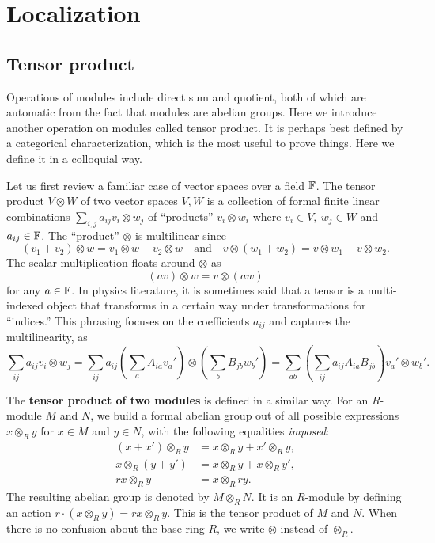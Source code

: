 \section{Localization}
\label{sec:localization}

\subsection*{Tensor product}
Operations of modules include direct sum and quotient,
both of which are automatic from the fact that modules are abelian groups.
Here we introduce another operation on modules called tensor product.
It is perhaps best defined by a categorical characterization,
which is the most useful to prove things.
Here we define it in a colloquial way.

Let us first review a familiar case of vector spaces over a field $\mathbb{F}$.
The tensor product $V \otimes W$ of two vector spaces $V,W$ is
a collection of formal finite linear combinations $\sum_{i,j} a_{ij} v_i \otimes w_j$ 
of ``products'' $v_i \otimes w_i$ where $v_i \in V,~ w_j \in W$ and $a_{ij} \in \mathbb{F}$.
The ``product'' $\otimes$ is multilinear since
\[
 (v_1 + v_2) \otimes w = v_1 \otimes w + v_2 \otimes w \quad \text{and} \quad
 v \otimes (w_1 + w_2) = v \otimes w_1 + v \otimes w_2.
\]
The scalar multiplication floats around $\otimes$ as
\[
 (a v) \otimes w = v \otimes (a w)
\]
for any $a \in \mathbb{F}$.
In physics literature, it is sometimes said that a tensor is a multi-indexed object
that transforms in a certain way under transformations for ``indices.''
This phrasing focuses on the coefficients $a_{ij}$ and captures the multilinearity, as
\[
 \sum_{ij} a_{ij} v_i \otimes w_j = \sum_{ij} a_{ij} \left( \sum_a A_{ia}v_a' \right) \otimes \left( \sum_b B_{jb} w_b' \right)
 = \sum_{ab} \left(\sum_{ij}a_{ij} A_{ia}B_{jb} \right) v_a' \otimes w_b'.
\]


The {\bf tensor product of two modules} is defined in a similar way.
For an $R$-module $M$ and $N$,
we build a formal abelian group out of all possible expressions $x \otimes_R y$ for $x \in M$ and $y \in N$,
with the following equalities {\em imposed}:
\begin{align}
 (x + x') \otimes_R y &= x \otimes_R y + x' \otimes_R y , \nonumber \\
 x \otimes_R (y + y')  &= x \otimes_R y + x \otimes_R y' ,\nonumber \\
 r x \otimes_R y &= x \otimes_R r y .\label{R-linear-tensor}
\end{align}
The resulting abelian group is denoted by $M \otimes_R N$.
It is an $R$-module by defining an action $r \cdot (x \otimes_R y) = rx \otimes_R y$.
This is the tensor product of $M$ and $N$.
When there is no confusion about the base ring $R$, we write $\otimes$ instead of $\otimes_R$.

